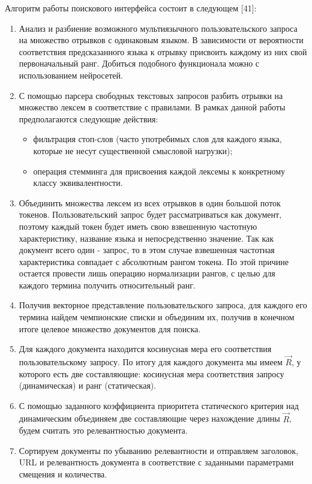 Алгоритм работы поискового интерфейса состоит в следующем [41]:
\begin{enumerate}
\item Анализ и разбиение возможного мультиязычного пользовательского запроса на множество отрывков с одинаковым языком. В зависимости от вероятности соответствия предсказанного языка к отрывку присвоить каждому из них свой первоначальный ранг. Добиться подобного функционала можно с использованием нейросетей.
\item С помощью парсера свободных текстовых запросов разбить отрывки на множество лексем в соответствие с правилами. В рамках данной работы предполагаются следующие действия:
\begin{itemize}
\item фильтрация стоп-слов (часто употребимых слов для каждого языка, которые не несут существенной смысловой нагрузки);
\item операция стемминга для присвоения каждой лексемы к конкретному классу эквивалентности.
\end{itemize}
\item Объединить множества лексем из всех отрывков в один большой поток токенов. Пользовательский запрос будет рассматриваться как документ, поэтому каждый токен будет иметь свою взвешенную частотную характеристику, название языка и непосредственно значение. Так как документ всего один - запрос, то в этом случае взвешенная частотная характеристика совпадает с абсолютным рангом токена. По этой причине остается провести лишь операцию нормализации рангов, с целью для каждого термина получить относительный ранг.
\item Получив векторное представление пользовательского запроса, для каждого его термина найдем чемпионские списки и объединим их, получив в конечном итоге целевое множество документов для поиска.
\item Для каждого документа находится косинусная мера его соответствия пользовательскому запросу. По итогу для каждого документа мы имеем $\vec{R}$, у которого есть две составляющие: косинусная мера соответствия запросу (динамическая) и ранг (статическая).
\item С помощью заданного коэффициента приоритета статического критерия над динамическим объединяем две составляющие через нахождение длины $\vec{R}$, будем считать это релевантностью документа.
\item Сортируем документы по убыванию релевантности и отправляем заголовок, URL и релевантность документа в соответствие с заданными параметрами смещения и количества.
\end{enumerate}

